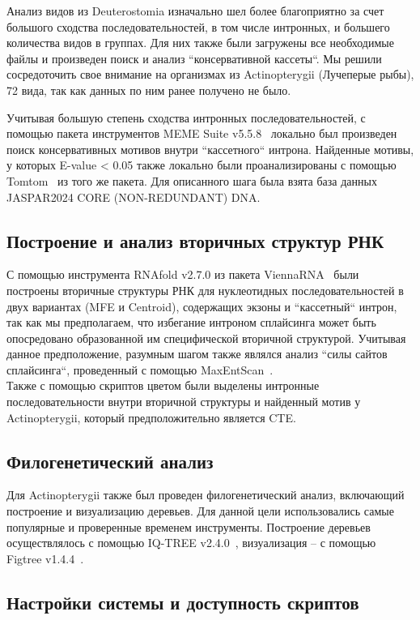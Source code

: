 Анализ видов из Deuterostomia изначально шел более благоприятно за счет большого сходства последовательностей, в том числе интронных, и большего количества видов в группах.
Для них также были загружены все необходимые файлы и произведен поиск и анализ ``консервативной кассеты``.
Мы решили сосредоточить свое внимание на организмах из Actinopterygii (Лучеперые рыбы), 72 вида, так как данных по ним ранее получено не было.

Учитывая большую степень сходства интронных последовательностей, с помощью пакета инструментов MEME Suite v5.5.8~\cite{meme} локально был произведен поиск консервативных мотивов внутри ``кассетного`` интрона.
Найденные мотивы, у которых E-value < 0.05 также локально были проанализированы с помощью Tomtom~\cite{tomtom} из того же пакета.
Для описанного шага была взята база данных JASPAR2024 CORE (NON-REDUNDANT) DNA.

\subsection{Построение и анализ вторичных структур РНК}

С помощью инструмента RNAfold v2.7.0 из пакета Vienna\-RNA~\cite{viennarna} были построены вторичные структуры РНК для нуклеотидных последовательностей в двух вариантах (MFE и Centroid), содержащих экзоны и ``кассетный`` интрон, так как мы предполагаем, что избегание интроном сплайсинга может быть опосредовано образованной им специфической вторичной структурой.
Учитывая данное предположение, разумным шагом также являлся анализ ``силы сайтов сплайсинга``, проведенный с помощью MaxEntScan~\cite{maxentsccan}.\\

Также с помощью скриптов цветом были выделены интронные последовательности внутри вторичной структуры и найденный мотив у Actinopterygii, который предположительно является CTE.

\subsection{Филогенетический анализ}

Для Actinopterygii также был проведен филогенетический анализ, включающий построение и визуализацию деревьев.
Для данной цели использовались самые популярные и проверенные временем инструменты.
Построение деревьев осуществлялось с помощью IQ-TREE v2.4.0~\cite{iqtree2}, визуализация – с помощью Figtree v1.4.4~\cite{figtree}.

\subsection{Настройки системы и доступность скриптов}

